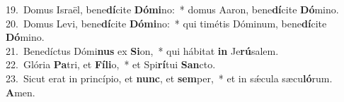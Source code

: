 {19.~}Domus Israël, bene\textbf{dí}cite \textbf{Dó}\textbf{mi}no:~* domus Aaron, bene\textbf{dí}cite \textbf{Dó}mino.\\
{20.~}Domus Levi, bene\textbf{dí}cite \textbf{Dó}\textbf{mi}no:~* qui timétis Dóminum, bene\textbf{dí}cite \textbf{Dó}mino.\\
{21.~}Benedíctus Dómi\textbf{nus} ex \textbf{Si}on,~* qui hábitat \textbf{in} Je\textbf{rú}salem.\\
{22.~}Glória \textbf{Pa}tri, et \textbf{Fí}\textbf{li}o,~* et Spi\textbf{rí}tui \textbf{San}cto.\\
{23.~}Sicut erat in princípio, et \textbf{nunc}, et \textbf{sem}per,~* et in sǽcula sæcu\textbf{ló}rum. \textbf{A}men.\\
